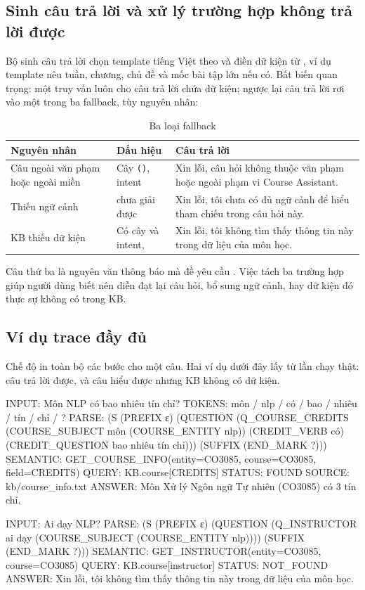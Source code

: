 \subsection{Sinh câu trả lời và xử lý trường hợp không trả lời được}

Bộ sinh câu trả lời chọn template tiếng Việt theo  và điền dữ kiện từ
, ví dụ template  nêu tuần, chương, chủ đề và mốc
bài tập lớn nếu có. Bất biến quan trọng: một truy vấn  luôn cho câu trả
lời chứa dữ kiện; ngược lại câu trả lời rơi vào một trong ba fallback, tùy nguyên nhân:

\begin{table}[htbp]
  \centering
  \small
  \begin{tabularx}{\linewidth}{|P{3.6cm}|P{3.4cm}|L|}
    \hline
    \textbf{Nguyên nhân} & \textbf{Dấu hiệu} & \textbf{Câu trả lời} \\ \hline
    Câu ngoài văn phạm hoặc ngoài miền & Cây \texttt{()}, intent  &
      Xin lỗi, câu hỏi không thuộc văn phạm hoặc ngoài phạm vi Course Assistant. \\ \hline
    Thiếu ngữ cảnh &  chưa giải được &
      Xin lỗi, tôi chưa có đủ ngữ cảnh để hiểu tham chiếu trong câu hỏi này. \\ \hline
    KB thiếu dữ kiện & Có cây và intent,  &
      Xin lỗi, tôi không tìm thấy thông tin này trong dữ liệu của môn học. \\ \hline
  \end{tabularx}
  \caption{Ba loại fallback}
  \label{tab:fallback}
\end{table}

Câu thứ ba là nguyên văn thông báo mà đề yêu cầu \cite{spec}. Việc tách ba trường hợp
giúp người dùng biết nên diễn đạt lại câu hỏi, bổ sung ngữ cảnh, hay dữ kiện đó thực sự
không có trong KB.

\subsection{Ví dụ trace đầy đủ}

Chế độ  in toàn bộ các bước cho một câu. Hai ví dụ dưới đây lấy từ lần
chạy thật: câu trả lời được, và câu hiểu được nhưng KB không có dữ kiện.
\begin{trace}
INPUT: Môn NLP có bao nhiêu tín chỉ?
TOKENS: môn / nlp / có / bao / nhiêu / tín / chỉ / ?
PARSE: (S (PREFIX ε) (QUESTION (Q_COURSE_CREDITS (COURSE_SUBJECT môn (COURSE_ENTITY nlp)) (CREDIT_VERB có) (CREDIT_QUESTION bao nhiêu tín chỉ))) (SUFFIX (END_MARK ?)))
SEMANTIC: GET_COURSE_INFO(entity=CO3085, course=CO3085, field=CREDITS)
QUERY: KB.course[CREDITS]
STATUS: FOUND
SOURCE: kb/course_info.txt
ANSWER: Môn Xử lý Ngôn ngữ Tự nhiên (CO3085) có 3 tín chỉ.
\end{trace}
\begin{trace}
INPUT: Ai dạy NLP?
PARSE: (S (PREFIX ε) (QUESTION (Q_INSTRUCTOR ai dạy (COURSE_SUBJECT (COURSE_ENTITY nlp)))) (SUFFIX (END_MARK ?)))
SEMANTIC: GET_INSTRUCTOR(entity=CO3085, course=CO3085)
QUERY: KB.course[instructor]
STATUS: NOT_FOUND
ANSWER: Xin lỗi, tôi không tìm thấy thông tin này trong dữ liệu của môn học.
\end{trace}

